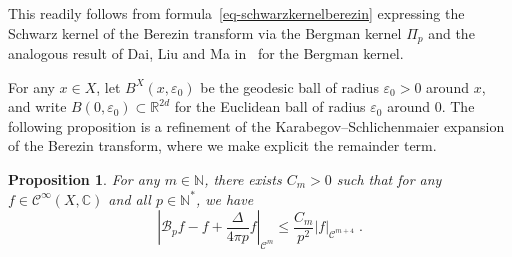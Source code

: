\documentclass[11pt]{article}
\newtheorem{prop}[theo]{Proposition}
\theoremstyle{definition}
\numberwithin{equation}{section}
\numberwithin{figure}{section}
\numberwithin{table}{section}
\newcommand{\R}{{\mathbb{R}}}
\newcommand{\N}{{\mathbb{N}}}
\newcommand{\CCC}{{\mathbb{C}}}
\newcommand{\CC}{\mathcal{C}}
\newcommand{\cB}{{\mathcal{B}}}
\renewcommand\leq {\leqslant}
\newcommand\< {\mathcal{h}}
\renewcommand\> {\mathcal{i}}
\newcommand{\cinf}{\CC^\infty}
\renewcommand{\epsilon}{\varepsilon}
\newcommand*\cC{\mathscr{C}}
\begin{document}
This readily follows from formula~\eqref{eq-schwarzkernelberezin} expressing the Schwarz kernel of the Berezin transform via the Bergman kernel $\Pi_p$ and the analogous result of Dai, Liu and Ma in~\cite[Theorem~4.18']{DLM06} for the Bergman kernel.

For any $x\in X$, let $B^X(x,\epsilon_0)$ be the geodesic ball of radius $\epsilon_0>0$ around $x$, and write $B(0,\epsilon_0)
\subset\R^{2d}$ for the Euclidean ball of radius $\epsilon_0$ around $0$. The following proposition is a refinement of the Karabegov--Schlichenmaier expansion~\cite[(1.2)]{KS01} of the Berezin transform, where we make explicit the remainder term.

\begin{prop}\label{KS}
For any $m\in\N$, there exists $C_m>0$ such that for any $f\in\cinf(X,\CCC)$ and all $p\in\N^*$, we have
\begin{equation}\label{KSexp}
\left|\cB_pf-f+\frac{\Delta}{4\pi p} f\right|_{\cC^m}\leq
\frac{C_m}{p^2}|f|_{\cC^{m+4}}\;.
\end{equation}
\end{prop}
\end{document}
